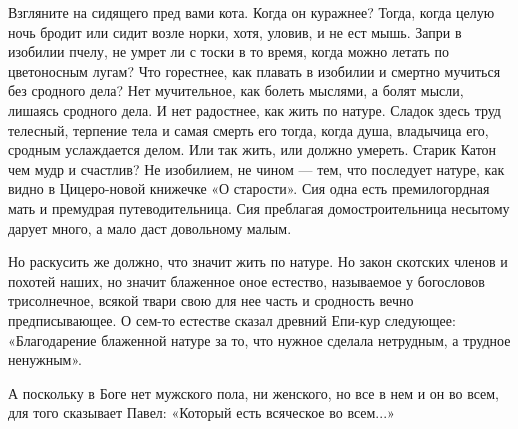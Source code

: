 Взгляните на сидящего пред вами кота. Когда он куражнее? Тогда, когда целую
ночь бродит или сидит возле норки, хотя, уловив, и не ест мышь. Запри в
изобилии пчелу, не умрет ли с тоски в то время, когда можно летать по
цветоносным лугам? Что горестнее, как плавать в изобилии и смертно мучиться без
сродного дела? Нет мучительное, как болеть мыслями, а болят мысли, лишаясь
сродного дела. И нет радостнее, как жить по натуре. Сладок здесь труд телесный,
терпение тела и самая смерть его тогда, когда душа, владычица его, сродным
услаждается делом. Или так жить, или должно умереть. Старик Катон чем мудр и
счастлив? Не изобилием, не чином — тем, что последует натуре, как видно в
Цицеро-новой книжечке «О старости». Сия одна есть премилогордная мать и
премудрая путеводительница. Сия преблагая домостроительница несытому дарует
много, а мало даст довольному малым.

Но раскусить же должно, что значит жить по натуре. Но закон скотских членов и
похотей наших, но значит блаженное оное естество, называемое у богословов
трисолнечное, всякой твари свою для нее часть и сродность вечно предписывающее.
О сем-то естестве сказал древний Епи-кур следующее: «Благодарение блаженной
натуре за то, что нужное сделала нетрудным, а трудное ненужным».

А поскольку в Боге нет мужского пола, ни женского, но все в нем и он во всем,
для того сказывает Павел: «Который есть всяческое во всем...» 
